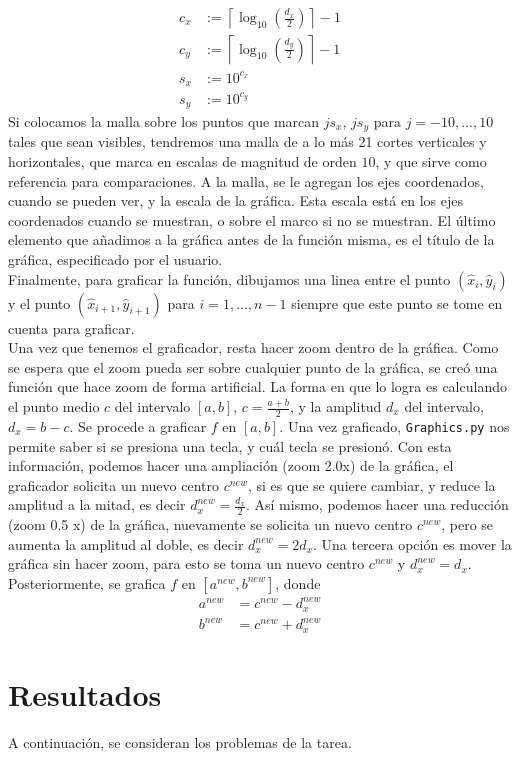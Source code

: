 \documentclass[10pt]{article}
\begin{document}
\begin{align*}
c_x&:=\left\lceil{\log_{10}\left(\frac{d_x}{2}\right)}\right\rceil -1\\
c_y&:=\left\lceil{\log_{10}\left(\frac{d_y}{2}\right)}\right\rceil -1\\
s_x&:=10^{c_x}\\
s_y&:=10^{c_y}
\end{align*}
Si colocamos la malla sobre los puntos que marcan $js_x$, $js_y$ para $j=-10,...,10$ tales que sean visibles, tendremos una malla de a lo más 21 cortes verticales y horizontales, que marca en escalas de magnitud de orden $10$, y que sirve como referencia para comparaciones. A la malla, se le agregan los ejes coordenados, cuando se pueden ver, y la escala de la gráfica. Esta escala está en los ejes coordenados cuando se muestran, o sobre el marco si no se muestran. El último elemento que añadimos a la gráfica antes de la función misma, es el título de la gráfica, especificado por el usuario.\\
Finalmente, para graficar la función, dibujamos una linea entre el punto $(\hat{x}_i,\hat{y}_i)$ y el punto $(\hat{x}_{i+1},\hat{y}_{i+1})$ para $i=1,...,n-1$ siempre que este punto se tome en cuenta para graficar.\\
Una vez que tenemos el graficador, resta hacer zoom dentro de la gráfica. Como se espera que el zoom pueda ser sobre cualquier punto de la gráfica, se creó una función que hace zoom de forma artificial. La forma en que lo logra es calculando el punto medio $c$ del intervalo $[a,b]$, $c=\frac{a+b}{2}$, y la amplitud $d_x$ del intervalo, $d_x=b-c$. Se procede a graficar $f$ en $[a,b]$. Una vez graficado, \texttt{Graphics.py} nos permite saber si se presiona una tecla, y cuál tecla se presionó. Con esta información, podemos hacer una ampliación (zoom 2.0x) de la gráfica, el graficador solicita un nuevo centro $c^{new}$, si es que se quiere cambiar, y reduce la amplitud a la mitad, es decir $d_x^{new}=\frac{d_x}{2}$. Así mismo, podemos hacer una reducción (zoom 0.5 x) de la gráfica, nuevamente se solicita un nuevo centro $c^{new}$, pero se aumenta la amplitud al doble, es decir $d_x^{new}=2d_x$. Una tercera opción es mover la gráfica sin hacer zoom, para esto se toma un nuevo centro $c^{new}$ y $d_x^{new}=d_x$. Posteriormente, se grafica $f$ en $[a^{new},b^{new}]$, donde
\begin{align*}
a^{new}&=c^{new}-d_x^{new}\\
b^{new}&=c^{new}+d_x^{new}
\end{align*}
\section{Resultados}
A continuación, se consideran los problemas de la tarea.
\end{document}
